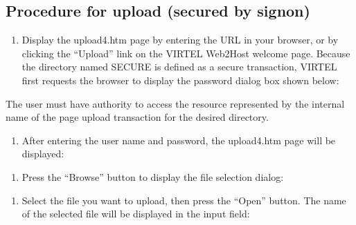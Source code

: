 \documentclass[letterpaper,10pt,english]{sphinxmanual}
\begin{document}
\subsection{Procedure for upload (secured by signon)}
\label{\detokenize{audit_operations_ and_performance:procedure-for-upload-secured-by-signon}}\label{\detokenize{audit_operations_ and_performance:index-59}}\begin{enumerate}
%
\item {} 
\sphinxAtStartPar
Display the upload4.htm page by entering the URL  in your browser, or by clicking the “Upload” link on the VIRTEL Web2Host welcome page. Because the directory named SECURE is defined as a secure transaction, VIRTEL first requests the browser to display the password dialog box shown below:

\end{enumerate}

\sphinxAtStartPar
{}

\sphinxAtStartPar
{}

\sphinxAtStartPar
The user must have authority to access the resource represented by the internal name of the page upload transaction for the desired directory.
\begin{enumerate}
%
\setcounter{enumi}{1}
\item {} 
\sphinxAtStartPar
After entering the user name and password, the upload4.htm page will be displayed:

\end{enumerate}

\sphinxAtStartPar
{}

\sphinxAtStartPar
{}
\begin{enumerate}
%
\setcounter{enumi}{2}
\item {} 
\sphinxAtStartPar
Press the “Browse” button to display the file selection dialog:

\end{enumerate}

\sphinxAtStartPar
{}

\sphinxAtStartPar
{}
\begin{enumerate}
%
\setcounter{enumi}{3}
\item {} 
\sphinxAtStartPar
Select the file you want to upload, then press the “Open” button. The name of the selected file will be displayed in the input field:

\end{enumerate}
\end{document}
